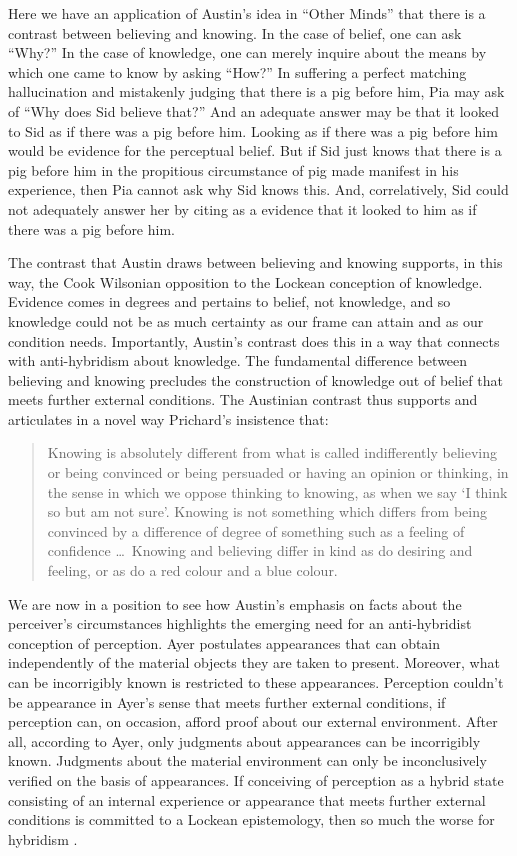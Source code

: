 \documentclass[11pt]{article}
\begin{document}
Here we have an application of Austin's \citeyearpar{Austin:1961kl} idea in ``Other Minds'' that there is a contrast between believing and knowing. In the case of belief, one can ask ``Why?'' In the case of knowledge, one can merely inquire about the means by which one came to know by asking ``How?'' In suffering a perfect matching hallucination and mistakenly judging that there is a pig before him, Pia may ask of ``Why does Sid believe that?'' And an adequate answer may be that it looked to Sid as if there was a pig before him. Looking as if there was a pig before him would be evidence for the perceptual belief. But if Sid just knows that there is a pig before him in the propitious circumstance of pig made manifest in his experience, then Pia cannot ask why Sid knows this. And, correlatively, Sid could not adequately answer her by citing as a evidence that it looked to him as if there was a pig before him. 

The contrast that Austin draws between believing and knowing supports, in this way, the Cook Wilsonian opposition to the Lockean conception of knowledge. Evidence comes in degrees and pertains to belief, not knowledge, and so knowledge could not be as much certainty as our frame can attain and as our condition needs. Importantly, Austin's contrast does this in a way that connects with anti-hybridism about knowledge. The fundamental difference between believing and knowing precludes the construction of knowledge out of belief that meets further external conditions. The Austinian contrast thus supports and articulates in a novel way Prichard's insistence that:
\begin{quote}
    Knowing is absolutely different from what is called indifferently believing or being convinced or being persuaded or having an opinion or thinking, in the sense in which we oppose thinking to knowing, as when we say `I think so but am not sure'. Knowing is not something which differs from being convinced by a difference of degree of something such as a feeling of confidence \ldots\ Knowing and believing differ in kind as do desiring and feeling, or as do a red colour and a blue colour. \citep[87]{Prichard:1950tg}
\end{quote} 

We are now in a position to see how Austin's emphasis on facts about the perceiver's circumstances highlights the emerging need for an anti-hybridist conception of perception. Ayer postulates appearances that can obtain independently of the material objects they are taken to present. Moreover, what can be incorrigibly known is restricted to these appearances. Perception couldn't be appearance in Ayer's sense that meets further external conditions, if perception can, on occasion, afford proof about our external environment. After all, according to Ayer, only judgments about appearances can be incorrigibly known. Judgments about the material environment can only be inconclusively verified on the basis of appearances. If conceiving of perception as a hybrid state consisting of an internal experience or appearance that meets further external conditions is committed to a Lockean epistemology, then so much the worse for hybridism \citep[see][for a contemporary defense]{Putnam:1994kx}. 
\end{document}
